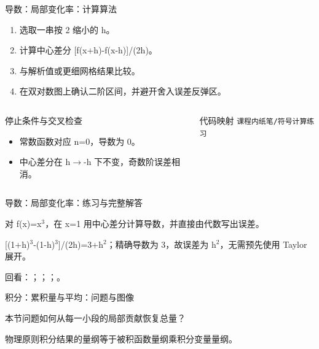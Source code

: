 \begin{frame}[t]{导数：局部变化率：计算算法}
\footnotesize
{}\begin{enumerate}
\item 选取一串按 2 缩小的 h。
\item 计算中心差分 [f(x+h)-f(x-h)]/\allowbreak{}(2h)。
\item 与解析值或更细网格结果比较。
\item 在双对数图上确认二阶区间，并避开舍入误差反弹区。
\end{enumerate}\begin{columns}[T,onlytextwidth]
\begin{block}{停止条件与交叉检查}\scriptsize\begin{itemize}
\item[\CheckMark] 常数函数对应 n=0，导数为 0。
\item[\CheckMark] 中心差分在 h\ensuremath{\rightarrow}-h 下不变，奇数阶误差相消。
\end{itemize}\end{block}
\begin{block}{代码映射}
\scriptsize \texttt{课程内纸笔/\allowbreak{}符号计算练习}
\end{block}\end{columns}\end{frame}

\begin{frame}[t]{导数：局部变化率：练习与完整解答}
\footnotesize
\begin{block}{}对 f(x)=x\ensuremath{^{3}}，在 x=1 用中心差分计算导数，并直接由代数写出误差。\end{block}
\begin{exampleblock}{}[(1+h)\ensuremath{^{3}}-(1-h)\ensuremath{^{3}}]/\allowbreak{}(2h)=3+h\ensuremath{^{2}}；精确导数为 3，故误差为 h\ensuremath{^{2}}，无需预先使用 Taylor 展开。\end{exampleblock}
\vfill
\scriptsize 回看：；；；。
\end{frame}

\begin{frame}[t]{积分：累积量与平均：问题与图像}
\footnotesize
\begin{block}{本节问题}如何从每一小段的局部贡献恢复总量？\end{block}
\begin{block}{物理原则}\quad 积分结果的量纲等于被积函数量纲乘积分变量量纲。\end{block}
\end{frame}


